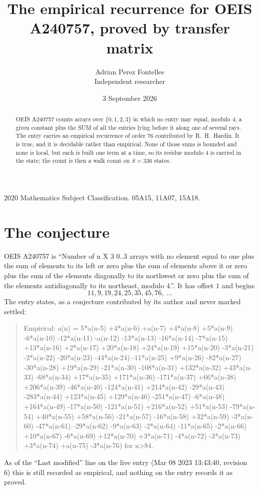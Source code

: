 \documentclass[11pt,a4paper]{article}
\title{The empirical recurrence for OEIS A240757, proved by transfer matrix}
\author{Adrian Perez Fontelles\\ \small Independent researcher}
\date{3 September 2026}
\theoremstyle{plain}
\theoremstyle{definition}
\begin{document}
\maketitle

\begin{abstract}
OEIS A240757 counts arrays over $\{0,1,2,3\}$ in which no entry may equal, modulo $4$, a given
constant plus the SUM of all the entries lying before it along one of several rays. The entry
carries an empirical recurrence of order $76$ contributed by R.~H.~Hardin. It is true, and
it is decidable rather than empirical. None of those sums is bounded and none is local, but
each is built one term at a time, so its residue modulo $4$ is carried in the state; the
count is then a walk count on $S=336$ states.
\end{abstract}

\noindent\small 2020 Mathematics Subject Classification. 05A15, 11A07, 15A18.\normalsize

\section{The conjecture}

OEIS A240757 is ``Number of n X 3 0..3 arrays with no element equal to one plus the sum of elements to its left or zero plus the sum of elements above it or zero plus the sum of the elements diagonally to its northwest or zero plus the sum of the elements antidiagonally to its northeast, modulo 4.''. It has offset $1$ and begins
\[
11, 9, 19, 24, 25, 35, 45, 76,\ \dots
\]
The entry states, as a conjecture contributed by its author and never marked settled:
\begin{quote}
Empirical: a(n) = 5*a(n-5) +4*a(n-6) +a(n-7) +4*a(n-8) +5*a(n-9) -6*a(n-10) -12*a(n-11) -a(n-12) -13*a(n-13) -16*a(n-14) -7*a(n-15) +13*a(n-16) +2*a(n-17) +20*a(n-18) +24*a(n-19) +15*a(n-20) -3*a(n-21) -2*a(n-22) -20*a(n-23) -44*a(n-24) -11*a(n-25) +9*a(n-26) -82*a(n-27) -30*a(n-28) +19*a(n-29) -21*a(n-30) -108*a(n-31) +132*a(n-32) +43*a(n-33) -68*a(n-34) +17*a(n-35) +171*a(n-36) -171*a(n-37) +66*a(n-38) +206*a(n-39) -46*a(n-40) -124*a(n-41) +214*a(n-42) -29*a(n-43) -283*a(n-44) +123*a(n-45) +129*a(n-46) -251*a(n-47) -6*a(n-48) +164*a(n-49) -17*a(n-50) -121*a(n-51) +216*a(n-52) +51*a(n-53) -79*a(n-54) +40*a(n-55) +58*a(n-56) -21*a(n-57) -16*a(n-58) +32*a(n-59) -3*a(n-60) -47*a(n-61) -29*a(n-62) -9*a(n-63) -2*a(n-64) -11*a(n-65) -2*a(n-66) +10*a(n-67) -6*a(n-69) +12*a(n-70) +3*a(n-71) -4*a(n-72) -3*a(n-73) +3*a(n-74) +a(n-75) -3*a(n-76) for n>84.
\end{quote}
As of the ``Last modified'' line on the live entry (Mar 08 2023 13:43:40, revision 6) this is still
recorded as empirical, and nothing on the entry records it as proved.
\end{document}
